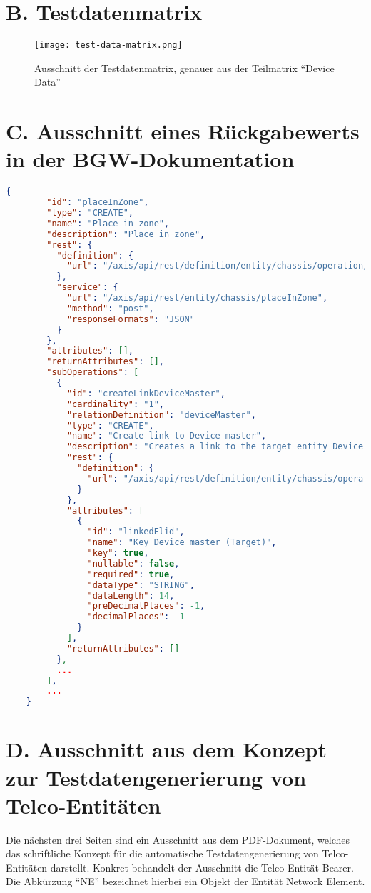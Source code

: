 \newpage
\section*{B. Testdatenmatrix}\label{app:testdatamatrix}
\begin{figure}[h!t]
    \centering
    \texttt{[image: test-data-matrix.png]}
    \caption[]{Ausschnitt der Testdatenmatrix, genauer aus der Teilmatrix \enquote{Device Data}}
\end{figure}

\newpage
\section*{C. Ausschnitt eines Rückgabewerts in der \ac{BGW}-Dokumentation}\label{app:bgeDoku}
\begin{lstlisting}[language=json, basicstyle=\scriptsize\ttfamily]
    {
        "id": "placeInZone",
        "type": "CREATE",
        "name": "Place in zone",
        "description": "Place in zone",
        "rest": {
          "definition": {
            "url": "/axis/api/rest/definition/entity/chassis/operation/placeInZone"
          },
          "service": {
            "url": "/axis/api/rest/entity/chassis/placeInZone",
            "method": "post",
            "responseFormats": "JSON"
          }
        },
        "attributes": [],
        "returnAttributes": [],
        "subOperations": [
          {
            "id": "createLinkDeviceMaster",
            "cardinality": "1",
            "relationDefinition": "deviceMaster",
            "type": "CREATE",
            "name": "Create link to Device master",
            "description": "Creates a link to the target entity Device master",
            "rest": {
              "definition": {
                "url": "/axis/api/rest/definition/entity/chassis/operation/placeInZone/suboperation/createLinkDeviceMaster"
              }
            },
            "attributes": [
              {
                "id": "linkedElid",
                "name": "Key Device master (Target)",
                "key": true,
                "nullable": false,
                "required": true,
                "dataType": "STRING",
                "dataLength": 14,
                "preDecimalPlaces": -1,
                "decimalPlaces": -1
              }
            ],
            "returnAttributes": []
          },
          ...
        ],
        ...
    }
\end{lstlisting}

\newpage
\section*{D. Ausschnitt aus dem Konzept zur Testdatengenerierung von Telco-Entitäten}\label{app:telcoKonzept}
Die nächsten drei Seiten sind ein Ausschnitt aus dem PDF-Dokument, welches das schriftliche Konzept für die automatische Testdatengenerierung von Telco-Entitäten darstellt. Konkret behandelt der Ausschnitt die Telco-Entität Bearer. Die Abkürzung \enquote{NE} bezeichnet hierbei ein Objekt der Entität Network Element.
